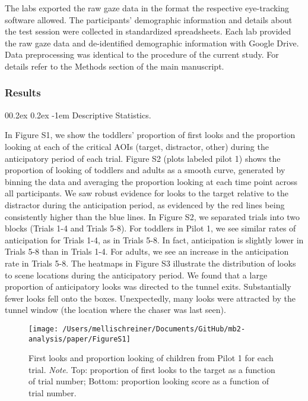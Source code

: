 \documentclass[
  man, donotrepeattitle,floatsintext]{apa6}
\makeatletter
\let\oldparagraph\paragraph
\renewcommand{\paragraph}{
    \@ifstar
      \xxxParagraphStar
      \xxxParagraphNoStar
  }
\newcommand{\xxxParagraphStar}[1]{\oldparagraph*{#1}\mbox{}}
\newcommand{\xxxParagraphNoStar}[1]{\oldparagraph{#1}\mbox{}}
\renewcommand{\paragraph}{\@startsection{paragraph}{4}{\parindent}%
  {0\baselineskip \@plus 0.2ex \@minus 0.2ex}%
  {-1em}%
  {\normalfont\normalsize\bfseries\itshape\typesectitle}}
\makeatother
\begin{document}
The labs exported the raw gaze data in the format the respective eye-tracking software allowed. The participants' demographic information and details about the test session were collected in standardized spreadsheets. Each lab provided the raw gaze data and de-identified demographic information with Google Drive. Data preprocessing was identical to the procedure of the current study. For details refer to the Methods section of the main manuscript.

\subsubsection{Results}\label{results}

\paragraph{Descriptive Statistics.}\label{descriptive-statistics.}

In Figure S1, we show the toddlers' proportion of first looks and the proportion looking at each of the critical AOIs (target, distractor, other) during the anticipatory period of each trial. Figure S2 (plots labeled pilot 1) shows the proportion of looking of toddlers and adults as a smooth curve, generated by binning the data and averaging the proportion looking at each time point across all participants. We saw robust evidence for looks to the target relative to the distractor during the anticipation period, as evidenced by the red lines being consistently higher than the blue lines. In Figure S2, we separated trials into two blocks (Trials 1-4 and Trials 5-8). For toddlers in Pilot 1, we see similar rates of anticipation for Trials 1-4, as in Trials 5-8. In fact, anticipation is slightly lower in Trials 5-8 than in Trials 1-4. For adults, we see an increase in the anticipation rate in Trials 5-8.
The heatmaps in Figure S3 illustrate the distribution of looks to scene locations during the anticipatory period. We found that a large proportion of anticipatory looks was directed to the tunnel exits. Substantially fewer looks fell onto the boxes. Unexpectedly, many looks were attracted by the tunnel window (the location where the chaser was last seen).

\begin{figure}

\texttt{[image: /Users/mellischreiner/Documents/GitHub/mb2-analysis/paper/FigureS1]} \hfill{}

\caption{First looks and proportion looking of children from Pilot 1 for each trial. \newline{} \textit{Note}. Top: proportion of first looks to the target as a function of trial number; Bottom: proportion looking score as a function of trial number.}\label{fig:figS1}
\end{figure}
\end{document}

